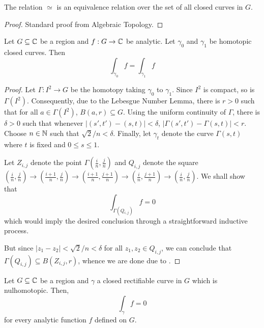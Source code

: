 \begin{lemma}
    The relation $\simeq$ is an equivalence relation over the set of all closed curves in $G$.
\end{lemma}
\begin{proof}
    Standard proof from Algebraic Topology.
\end{proof}


\begin{theorem}[Cauchy]
    Let $G\subseteq\mathbb{C}$ be a region and $f: G\to\mathbb{C}$ be analytic. Let $\gamma_0$ and $\gamma_1$ be homotopic closed curves. Then 
    \begin{equation*}
        \int_{\gamma_0} f = \int_{\gamma_1} f
    \end{equation*}
\end{theorem}
\begin{proof}
    Let $\Gamma: I^2\to G$ be the homotopy taking $\gamma_0$ to $\gamma_1$. Since $I^2$ is compact, so is $\Gamma(I^2)$. Consequently, due to the Lebesgue Number Lemma, there is $r > 0$ such that for all $a\in\Gamma(I^2)$, $B(a,r)\subseteq G$. Using the uniform continuity of $\Gamma$, there is $\delta > 0$ such that whenever $|(s',t') - (s,t)| < \delta$, $|\Gamma(s',t') - \Gamma(s,t)| < r$. Choose $n\in\mathbb{N}$ such that $\sqrt{2}/n < \delta$. Finally, let $\gamma_t$ denote the curve $\Gamma(s,t)$ where $t$ is fixed and $0\le s\le 1$.

    Let $Z_{i,j}$ denote the point $\Gamma\left(\frac{i}{n},\frac{j}{n}\right)$ and $Q_{i,j}$ denote the square $\left(\frac{i}{n}, \frac{j}{n}\right)\to\left(\frac{i+1}{n}, \frac{j}{n}\right)\to\left(\frac{i+1}{n}, \frac{j+1}{n}\right)\to\left(\frac{i}{n}, \frac{j+1}{n}\right)\to\left(\frac{i}{n}, \frac{j}{n}\right)$. We shall show that 
    \begin{equation*}
        \int_{\Gamma(Q_{i,j})} f = 0
    \end{equation*}
    which would imply the desired conclusion through a straightforward inductive process.

    But since $|z_1 - z_2| < \sqrt{2}/n < \delta$ for all $z_1,z_2\in Q_{i,j}$, we can conclude that $\Gamma(Q_{i,j})\subseteq B\left(Z_{i,j}, r\right)$, whence we are done due to .
\end{proof}

\begin{corollary}
    Let $G\subseteq\mathbb{C}$ be a region and $\gamma$ a closed rectifiable curve in $G$ which is nulhomotopic. Then, 
    \begin{equation*}
        \int_\gamma f = 0
    \end{equation*}
    for every analytic function $f$ defined on $G$.
\end{corollary}

